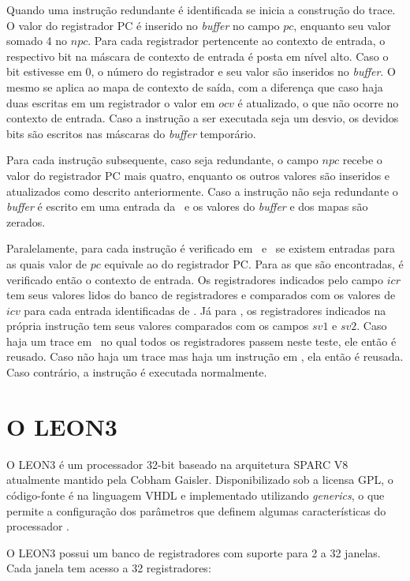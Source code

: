 Quando uma instrução redundante é identificada se inicia a construção do trace. O valor do registrador PC é inserido no \textit{buffer} no campo $pc$, enquanto seu valor somado 4 no $npc$. Para cada registrador pertencente ao contexto de entrada, o respectivo bit na máscara de contexto de entrada é posta em nível alto. Caso o bit estivesse em $0$, o número do registrador e seu valor são inseridos no \textit{buffer}. O mesmo se aplica ao mapa de contexto de saída, com a diferença que caso haja duas escritas em um registrador o valor em $ocv$ é atualizado, o que não ocorre no contexto de entrada. Caso a instrução a ser executada seja um desvio, os devidos bits são escritos nas máscaras do \textit{buffer} temporário. 

Para cada instrução subsequente, caso seja redundante, o campo $npc$ recebe o valor do registrador PC mais quatro, enquanto os outros valores são inseridos e atualizados como descrito anteriormente. Caso a instrução não seja redundante o \textit{buffer} é escrito em uma entrada da \tablet\ e os valores do \textit{buffer} e dos mapas são zerados.

Paralelamente, para cada instrução é verificado em \tableg\ e \tablet\ se existem entradas para as quais valor de $pc$ equivale ao do registrador PC. Para as que são encontradas, é verificado então o contexto de entrada. Os registradores indicados pelo campo $icr$ tem seus valores lidos do banco de registradores e comparados com os valores de $icv$ para cada entrada identificadas de \tablet. Já para \tableg, os registradores indicados na própria instrução tem seus valores comparados com os campos $sv1$ e $sv2$. Caso haja um trace em \tablet\ no qual todos os registradores passem neste teste, ele então é reusado. Caso não haja um trace mas haja um instrução em \tableg, ela então é reusada. Caso contrário, a instrução é executada normalmente.

\section{O LEON3}
\label{Fundamentacao:LEON3}

O LEON3 é um processador 32-bit baseado na arquitetura SPARC V8 atualmente mantido pela Cobham Gaisler. Disponibilizado sob a licensa GPL, o código-fonte é na linguagem VHDL e implementado utilizando \textit{generics}, o que permite a configuração dos parâmetros que definem algumas características do processador \cite{grlibmanual}.

O LEON3 possui um banco de registradores com suporte para 2 a 32 janelas. Cada janela tem acesso a 32 registradores:

